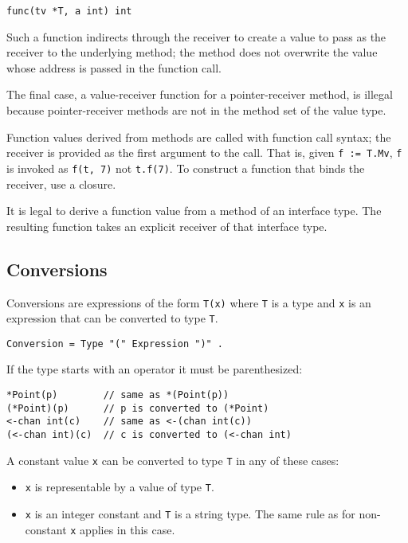 \begin{Verbatim}[frame=single]
func(tv *T, a int) int
\end{Verbatim}

Such a function indirects through the receiver to create a value to pass
as the receiver to the underlying method; the method does not overwrite
the value whose address is passed in the function call.

The final case, a value-receiver function for a pointer-receiver method,
is illegal because pointer-receiver methods are not in the method set of
the value type.

Function values derived from methods are called with function call
syntax; the receiver is provided as the first argument to the call. That
is, given \texttt{f := T.Mv}, \texttt{f} is invoked as \texttt{f(t, 7)}
not \texttt{t.f(7)}. To construct a function that binds the receiver,
use a closure.

It is legal to derive a function value from a method of an interface
type. The resulting function takes an explicit receiver of that
interface type.

\subsection*{Conversions}

Conversions are expressions of the form \texttt{T(x)} where \texttt{T}
is a type and \texttt{x} is an expression that can be converted to type
\texttt{T}.

\begin{Verbatim}[frame=single]
Conversion = Type "(" Expression ")" .
\end{Verbatim}

If the type starts with an operator it must be parenthesized:

\begin{Verbatim}[frame=single]
*Point(p)        // same as *(Point(p))
(*Point)(p)      // p is converted to (*Point)
<-chan int(c)    // same as <-(chan int(c))
(<-chan int)(c)  // c is converted to (<-chan int)
\end{Verbatim}

A constant value \texttt{x} can be converted to
type \texttt{T} in any of these cases:

\begin{itemize}
\item
  \texttt{x} is representable by a value of type \texttt{T}.
\item
  \texttt{x} is an integer constant and \texttt{T} is a
  string type. The same rule as for
  non-constant \texttt{x} applies in this case.
\end{itemize}

